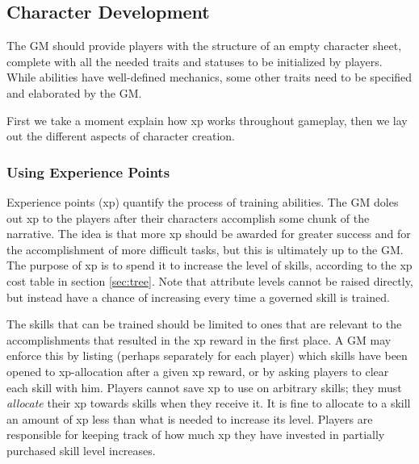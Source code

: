 \documentclass[12pt]{article}
\begin{document}
\subsection{Character Development}\label{sec:dev}

The GM should provide players with the structure of an empty character sheet,
complete with all the needed traits and statuses to be initialized by players.
While abilities have well-defined mechanics, some other traits
need to be specified and elaborated by the GM.

First we take a moment explain how xp works throughout gameplay,
then we lay out the different aspects of character creation.

\subsubsection{Using Experience Points}
Experience points (xp) quantify the process of training abilities.
The GM doles out xp to the players after their characters accomplish some chunk of the narrative.
The idea is that more xp should be awarded for greater success and for the accomplishment of more difficult tasks,
but this is ultimately up to the GM.
The purpose of xp is to spend it to increase the level of skills, according to the xp cost table in section \ref{sec:tree}.
Note that attribute levels cannot be raised directly, but instead have a chance of increasing every time a governed skill is trained.

The skills that can be trained should be limited to ones that are relevant to the accomplishments that resulted in the xp reward in the first place.
A GM may enforce this by listing 
(perhaps separately for each player)
which skills have been opened
to xp-allocation after a given xp reward,
or by asking players to clear each skill with him.
Players cannot save xp to use on arbitrary skills; they must \emph{allocate} their xp towards skills when they receive it.
It is fine to allocate to a skill an amount of xp less than what is needed to increase its level.
Players are responsible for keeping track of how much xp they have invested in partially purchased skill level increases.
\end{document}
